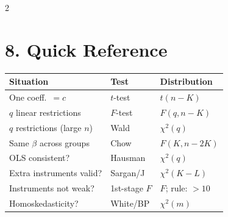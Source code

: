\documentclass[9pt,a4paper]{article}
\begin{document}
\begin{multicols}{2}
\section{8.\; Quick Reference}

\begin{tabular}{@{}p{3.2cm}p{2.4cm}p{1.8cm}@{}}
  \toprule
  Situation & Test & Distribution \\
  \midrule
  One coeff.\ $= c$ & $t$-test & $t(n-K)$ \\
  $q$ linear restrictions & $F$-test & $F(q,n-K)$ \\
  $q$ restrictions (large $n$) & Wald & $\chi^2(q)$ \\
  Same $\beta$ across groups & Chow & $F(K,n-2K)$ \\
  OLS consistent? & Hausman & $\chi^2(q)$ \\
  Extra instruments valid? & Sargan/J & $\chi^2(K-L)$ \\
  Instruments not weak? & 1st-stage $F$ & $F$; rule: $>10$ \\
  Homoskedasticity? & White/BP & $\chi^2(m)$ \\
  \bottomrule
\end{tabular}

\end{multicols}
\end{document}
